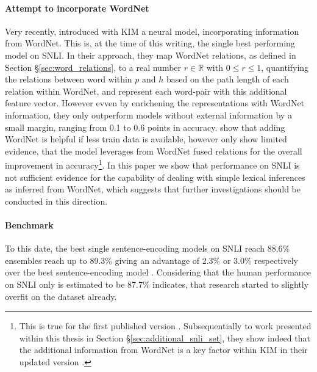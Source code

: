 \paragraph*{Attempt to incorporate WordNet}
Very recently, \cite{chen2017natural} introduced with \ac{KIM} a neural model, incorporating information from WordNet. This is, at the time of this writing,  the single best performing model on \ac{SNLI}. In their approach, they map WordNet relations, as defined in Section §\ref{sec:word_relations}, to a real number $r \in \mathbb{R}$ with $0 \leq r \leq 1$, quantifying the relations between word within $p$ and $h$ based on the path length of each relation within WordNet, and represent each word-pair with this additional feature vector. However evven by enrichening the representations with WordNet information, they only outperform models without external information by a small margin, ranging from 0.1 to 0.6 points in accuracy. \cite{chen2017natural} show that adding WordNet is helpful if less train data is available, however only show limited evidence, that the model leverages from WordNet fused relations for the overall improvement in accuracy\footnote{This is true for the first published version \citep{chen2017natural}. Subsequentially to work presented within this thesis in Section §\ref{sec:additional_snli_set}, they show indeed that the additional information from WordNet is a key factor within \ac{KIM} in their updated version \citep{chen-EtAl:2017b:natural}.}. In this paper we show that performance on \ac{SNLI} is not sufficient evidence for the capability of dealing with simple lexical inferences as inferred from WordNet, which suggests that further investigations should be conducted in this direction.

\paragraph*{Benchmark}
To this date, the best single sentence-encoding models on \ac{SNLI} reach 88.6\% \citep{chen2017natural} ensembles reach up to 89.3\% \citep{tay2017compare,peters2018deep,ghaeini2018dr} giving an advantage of 2.3\% or 3.0\% respectively over the best sentence-encoding model \citep{im2017distance}. Considering that the human performance on \ac{SNLI} only is estimated to be 87.7\% \citep{gong2017natural} indicates, that research started to slightly overfit on the dataset already. 

